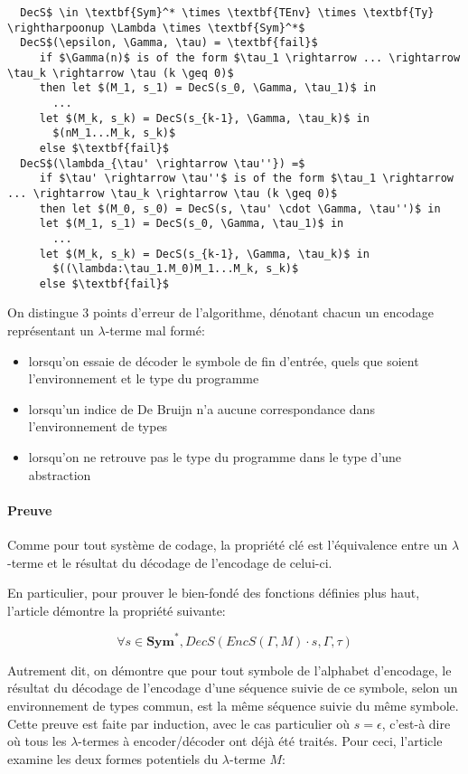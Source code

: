 \documentclass[titlepage]{article}
\let\oldparagraph\paragraph
\renewcommand{\paragraph}[1]{\oldparagraph{#1}\mbox{}}
\begin{document}
\begin{lstlisting}
  DecS$ \in \textbf{Sym}^* \times \textbf{TEnv} \times \textbf{Ty} \rightharpoonup \Lambda \times \textbf{Sym}^*$
  DecS$(\epsilon, \Gamma, \tau) = \textbf{fail}$
     if $\Gamma(n)$ is of the form $\tau_1 \rightarrow ... \rightarrow \tau_k \rightarrow \tau (k \geq 0)$
     then let $(M_1, s_1) = DecS(s_0, \Gamma, \tau_1)$ in
       ...
     let $(M_k, s_k) = DecS(s_{k-1}, \Gamma, \tau_k)$ in
       $(nM_1...M_k, s_k)$
     else $\textbf{fail}$
  DecS$(\lambda_{\tau' \rightarrow \tau''}) =$
     if $\tau' \rightarrow \tau''$ is of the form $\tau_1 \rightarrow ... \rightarrow \tau_k \rightarrow \tau (k \geq 0)$
     then let $(M_0, s_0) = DecS(s, \tau' \cdot \Gamma, \tau'')$ in
     let $(M_1, s_1) = DecS(s_0, \Gamma, \tau_1)$ in
       ...
     let $(M_k, s_k) = DecS(s_{k-1}, \Gamma, \tau_k)$ in
       $((\lambda:\tau_1.M_0)M_1...M_k, s_k)$
     else $\textbf{fail}$
\end{lstlisting}

On distingue 3 points d'erreur de l'algorithme, dénotant chacun un encodage représentant un
$\lambda$-terme mal formé:

\begin{itemize}
\item lorsqu'on essaie de décoder le symbole de fin d'entrée, quels que soient l'environnement et le type du programme
\item lorsqu'un indice de De Bruijn n'a aucune correspondance dans l'environnement de types
\item lorsqu'on ne retrouve pas le type du programme dans le type d'une abstraction 
\end{itemize}

\paragraph{Preuve}\label{preuve}

Comme pour tout système de codage, la propriété clé est l'équivalence
entre un \(\lambda\)-terme et le résultat du décodage de l'encodage de
celui-ci.

En particulier, pour prouver le bien-fondé des fonctions définies plus
haut, l'article démontre la propriété suivante:

\[\forall s \in \textbf{Sym}^*, DecS(EncS(\Gamma, M) \cdot s,\Gamma,\tau)\]

Autrement dit, on démontre que pour tout symbole de l'alphabet
d'encodage, le résultat du décodage de l'encodage d'une séquence suivie
de ce symbole, selon un environnement de types commun, est la même
séquence suivie du même symbole. Cette preuve est faite par induction,
avec le cas particulier où \(s = \epsilon\), c'est-à dire où tous les
\(\lambda\)-termes à encoder/décoder ont déjà été traités. Pour ceci,
l'article examine les deux formes potentiels du \(\lambda\)-terme \(M\):
\end{document}

